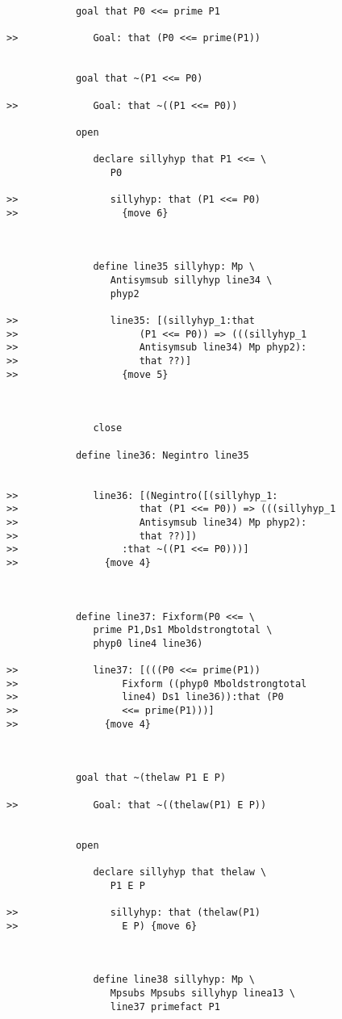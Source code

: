 \documentclass[12pt]{article}
\begin{document}
\begin{verbatim}
            goal that P0 <<= prime P1

>>             Goal: that (P0 <<= prime(P1))


            goal that ~(P1 <<= P0)

>>             Goal: that ~((P1 <<= P0))

            open

               declare sillyhyp that P1 <<= \
                  P0

>>                sillyhyp: that (P1 <<= P0)
>>                  {move 6}



               define line35 sillyhyp: Mp \
                  Antisymsub sillyhyp line34 \
                  phyp2

>>                line35: [(sillyhyp_1:that
>>                     (P1 <<= P0)) => (((sillyhyp_1
>>                     Antisymsub line34) Mp phyp2):
>>                     that ??)]
>>                  {move 5}



               close

            define line36: Negintro line35


>>             line36: [(Negintro([(sillyhyp_1:
>>                     that (P1 <<= P0)) => (((sillyhyp_1
>>                     Antisymsub line34) Mp phyp2):
>>                     that ??)])
>>                  :that ~((P1 <<= P0)))]
>>               {move 4}



            define line37: Fixform(P0 <<= \
               prime P1,Ds1 Mboldstrongtotal \
               phyp0 line4 line36)

>>             line37: [(((P0 <<= prime(P1))
>>                  Fixform ((phyp0 Mboldstrongtotal
>>                  line4) Ds1 line36)):that (P0
>>                  <<= prime(P1)))]
>>               {move 4}



            goal that ~(thelaw P1 E P)

>>             Goal: that ~((thelaw(P1) E P))


            open

               declare sillyhyp that thelaw \
                  P1 E P

>>                sillyhyp: that (thelaw(P1)
>>                  E P) {move 6}



               define line38 sillyhyp: Mp \
                  Mpsubs Mpsubs sillyhyp linea13 \
                  line37 primefact P1


\end{verbatim}
\end{document}
